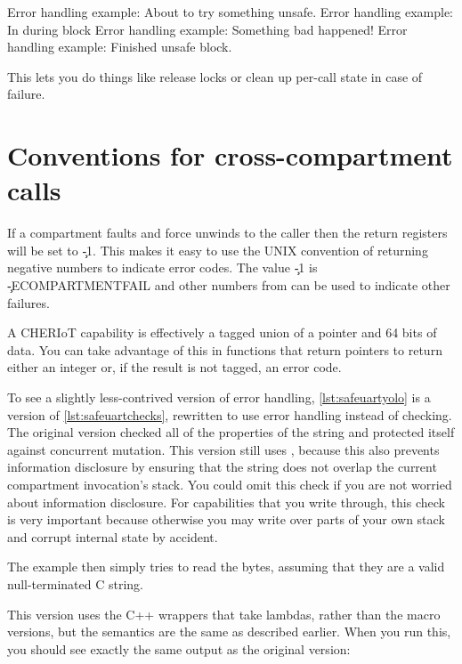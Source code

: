 \begin{console}
Error handling example: About to try something unsafe.
Error handling example: In during block
Error handling example: Something bad happened!
Error handling example: Finished unsafe block.
\end{console}

This lets you do things like release locks or clean up per-call state in case of failure.

\section{Conventions for cross-compartment calls}

If a compartment faults and force unwinds to the caller then the return registers will be set to \c{-1}.
This makes it easy to use the UNIX convention of returning negative numbers to indicate error codes.
The value \c{-1} is \c{-ECOMPARTMENTFAIL} and other numbers from  can be used to indicate other failures.

A CHERIoT capability is effectively a tagged union of a pointer and 64 bits of data.
You can take advantage of this in functions that return pointers to return either an integer or, if the result is not tagged, an error code.

To see a slightly less-contrived version of error handling, \ref{lst:safeuartyolo} is a version of \ref{lst:safeuartchecks}, rewritten to use error handling instead of checking.
The original version checked all of the properties of the string and protected itself against concurrent mutation.
This version still uses , because this also prevents information disclosure by ensuring that the string does not overlap the current compartment invocation's stack.
You could omit this check if you are not worried about information disclosure.
For capabilities that you write through, this check is very important because otherwise you may write over parts of your own stack and corrupt internal state by accident.

The example then simply tries to read the bytes, assuming that they are a valid null-terminated C string.

\codelisting[marker=safe_uart,caption=Using structured error handling to ensure that a function does not crash.,label=lst:safeuartyolo, filename=examples/yolo_arguments/uart.cc]{}

This version uses the C++ wrappers that take lambdas, rather than the macro versions, but the semantics are the same as described earlier.
When you run this, you should see exactly the same output as the original version:

